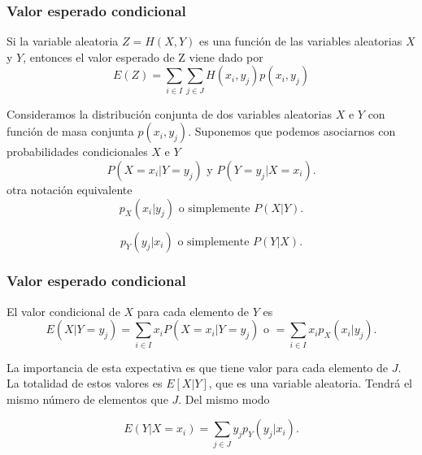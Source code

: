 \documentclass[spanish]{beamer}
\begin{document}
\begin{frame}
\frametitle{Valor esperado condicional}  
Si la variable aleatoria $Z = H (X, Y)$ es una función de las variables aleatorias $X$ y $Y$, entonces el valor esperado de Z viene dado por
\begin{equation*}
E(Z)= \sum_{i\in I} \sum_{j\in J} H(x_{i},y_{j})p(x_{i},y_{j} )
\end{equation*}

Consideramos la distribución conjunta de dos variables aleatorias $X$ e $Y$ con función de masa conjunta $p(x_{i},y_{j} )$. Suponemos que podemos asociarnos con probabilidades condicionales $X$ e $Y$
\begin{equation*}
P (X = x_{i} \vert  Y = y_{j} ) \text{ y  }  P (Y = y_{j} \vert X = x_{i}).
\end{equation*}
otra notación equivalente 
\begin{equation*}
p_{X}(x_{i} \vert y_{j} ) \text{ o simplemente  }  P (X \vert Y).
\end{equation*}

\begin{equation*}
p_{Y}(y_{j} \vert x_{i} ) \text{ o simplemente  }  P (Y \vert X).
\end{equation*}

\end{frame}


\begin{frame}
\frametitle{Valor esperado condicional}  
El valor condicional de $X$ para cada elemento de $Y$ es
\begin{equation*}
E(X\vert Y = y_{j}) =  \sum_{i\in I}  x_{i} P(X = x_{i} \vert Y = y_{j}) \text{ o }= \sum_{i\in I}  x_{i} p_{X}(x_{i} \vert y_{j} ).
\end{equation*}

La importancia de esta expectativa es que tiene valor para cada elemento de $J$. La totalidad de estos valores es $E [X  \vert Y]$, que es una variable aleatoria. Tendrá el mismo número de elementos que $J$. Del mismo modo

\begin{equation*}
E(Y \vert X = x_{i}) = \sum_{j\in J}  y_{j} p_{Y}(y_{j} \vert x_{i} ).
\end{equation*}

\end{frame}
\end{document}
